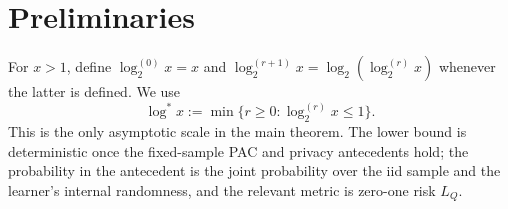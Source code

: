 \section{Preliminaries}
\label{sec:preliminaries}

For $x>1$, define $\log_2^{(0)}x=x$ and
$\log_2^{(r+1)}x=\log_2(\log_2^{(r)}x)$ whenever the latter is defined.
We use
\[
\log^*x:=\min\{r\geq0:\log_2^{(r)}x\leq1\}.
\]
This is the only asymptotic scale in the main theorem.  The lower bound is
deterministic once the fixed-sample PAC and privacy antecedents hold; the
probability in the antecedent is the joint probability over the iid sample
and the learner's internal randomness, and the relevant metric is zero-one
risk $L_Q$.
